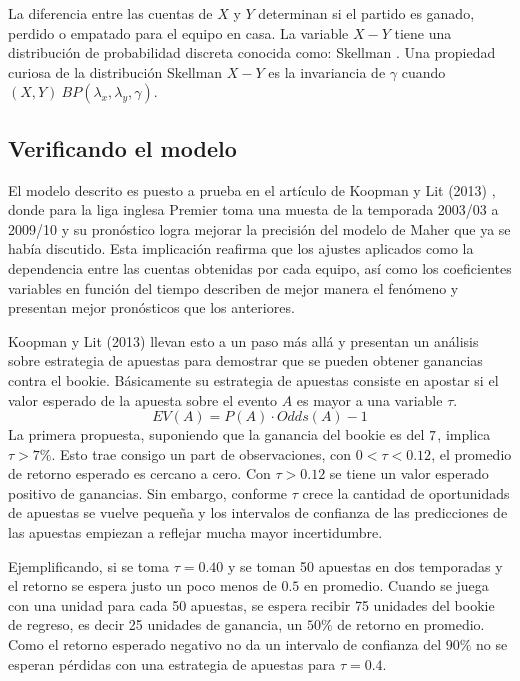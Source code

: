 La diferencia entre las cuentas de $X$ y $Y$ determinan si el partido es ganado, perdido o empatado para el equipo en casa. La variable $X-Y$ tiene una distribución de probabilidad discreta conocida como: Skellman \cite{skellam1946frequency}. Una propiedad curiosa de la distribución Skellman $X-Y$ es la invariancia de $\gamma$ cuando $(X,Y) ~ BP(\lambda_x,\lambda_y,\gamma)$.

\subsection{Verificando el modelo}
\label{subsec:verification}

El modelo descrito es puesto a prueba en el artículo de Koopman y Lit (2013) \cite{koopman2013dynamic}, donde para la liga inglesa Premier toma una muesta de la temporada 2003/03 a 2009/10 y su pronóstico logra mejorar la precisión del modelo de Maher \cite{maher1982modelling} que ya se había discutido. Esta implicación reafirma que los ajustes aplicados como la dependencia entre las cuentas obtenidas por cada equipo, así como los coeficientes variables en función del tiempo describen de mejor manera el fenómeno y presentan mejor pronósticos que los anteriores.

Koopman y Lit (2013) \cite{koopman2013dynamic} llevan esto a un paso más allá y presentan un análisis sobre estrategia de apuestas para demostrar que se pueden obtener ganancias contra el bookie. Básicamente su estrategia de apuestas consiste en apostar si el valor esperado de la apuesta sobre el evento $A$ es mayor a una variable $\tau$.
\[EV(A) = P(A) \cdot Odds(A) - 1 \]
La primera propuesta, suponiendo que la ganancia del bookie es del $7\/$, implica $\tau > 7\%$. Esto trae consigo un part de observaciones, con $0<\tau<0.12$, el promedio de retorno esperado es cercano a cero. Con $\tau>0.12$ se tiene un valor esperado positivo de ganancias. Sin embargo, conforme $\tau$ crece  la cantidad de oportunidads de apuestas se vuelve pequeña y los intervalos de confianza de las predicciones de las apuestas empiezan a reflejar mucha mayor incertidumbre.

Ejemplificando, si se toma $\tau = 0.40$ y se toman 50 apuestas en dos temporadas y el retorno se espera justo un poco menos de $0.5$ en promedio. Cuando se juega con una unidad para cada 50 apuestas, se espera recibir 75 unidades del bookie de regreso, es decir 25 unidades de ganancia, un $50\%$ de retorno en promedio. Como el retorno esperado negativo no da un intervalo de confianza del $90\%$ no se esperan pérdidas con una estrategia de apuestas para $\tau = 0.4$.

